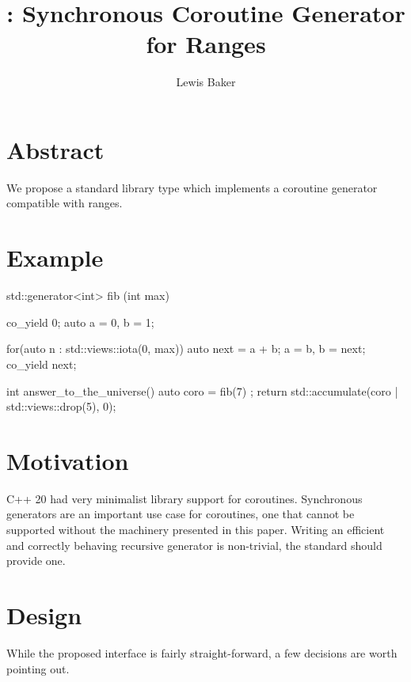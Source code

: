 \documentclass{wg21}
\title{\tcode{std::generator}: Synchronous Coroutine Generator for Ranges}
\author{Lewis Baker}{lbaker@fb.com }
\begin{document}
\maketitle


\section{Abstract}

We propose a standard library type  which implements a coroutine generator compatible with ranges.

\section{Example}

\begin{colorblock}
std::generator<int> fib (int max) {
    co_yield 0;
    auto a = 0, b = 1;
    
    for(auto n : std::views::iota(0, max))  {
        auto next = a + b;
        a = b, b = next;
        co_yield next;
    }
}

int answer_to_the_universe() {
    auto coro = fib(7) ;
    return std::accumulate(coro | std::views::drop(5), 0);
}

\end{colorblock}

\section{Motivation}

C++ 20 had very minimalist library support for coroutines.
Synchronous generators are an important use case for coroutines, one that cannot be supported without 
the machinery presented in this paper.
Writing an efficient and correctly behaving recursive generator is non-trivial, the standard should provide one.

 
\section{Design}

While the proposed  interface is fairly straight-forward, a few decisions are worth pointing out.

\subsection{}
\end{document}
